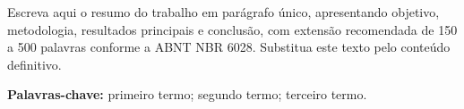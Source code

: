 \begin{resumo}
  \noindent Escreva aqui o resumo do trabalho em parágrafo único, apresentando objetivo, metodologia, resultados principais e conclusão, com extensão recomendada de 150 a 500 palavras conforme a ABNT NBR 6028. Substitua este texto pelo conteúdo definitivo.

  \vspace{\onelineskip}
  \noindent\textbf{Palavras-chave:} primeiro termo; segundo termo; terceiro termo.
\end{resumo}
